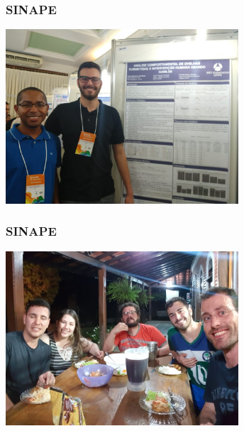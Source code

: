 \documentclass[10pt,
  aspectratio=169,
  serif,
  mathserif,
  professionalfont,
  compress,
  handout,
  ]{beamer}\usepackage[]{graphicx}\usepackage[]{color}
\begin{document}
\begin{frame}

\frametitle{SINAPE}

\begin{center}
  \includegraphics[height=6.5cm]{img/sinape3.jpg}
\end{center}

\end{frame}


\begin{frame}

\frametitle{SINAPE}

\begin{center}
  \includegraphics[height=6.5cm]{img/sinape1.jpg}
\end{center}

\end{frame}

\end{document}
